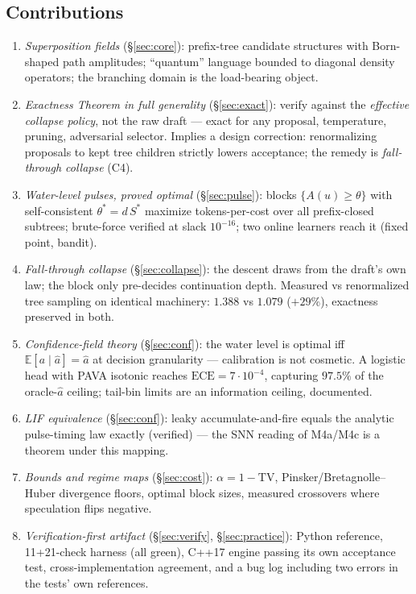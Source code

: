 \documentclass[11pt,a4paper]{article}
\theoremstyle{definition}
\begin{document}
\subsection{Contributions}
\begin{enumerate}[label=\textbf{C\arabic*},leftmargin=3.6em]
\item \emph{Superposition fields} (\S\ref{sec:core}): prefix-tree candidate
structures with Born-shaped path amplitudes; ``quantum'' language bounded to
diagonal density operators; the branching domain is the load-bearing object.
\item \emph{Exactness Theorem in full generality} (\S\ref{sec:exact}): verify
against the \emph{effective collapse policy}, not the raw draft --- exact for
any proposal, temperature, pruning, adversarial selector. Implies a design
correction: renormalizing proposals to kept tree children strictly lowers
acceptance; the remedy is \emph{fall-through collapse} (C4).
\item \emph{Water-level pulses, proved optimal} (\S\ref{sec:pulse}):
blocks $\{A(u)\ge\theta\}$ with self-consistent $\theta^\ast=d\,S^\ast$
maximize tokens-per-cost over all prefix-closed subtrees; brute-force
verified at slack $10^{-16}$; two online learners reach it (fixed point,
bandit).
\item \emph{Fall-through collapse} (\S\ref{sec:collapse}): the descent draws
from the draft's own law; the block only pre-decides continuation depth.
Measured vs renormalized tree sampling on identical machinery:
$1.388$ vs $1.079$ ($+29\%$), exactness preserved in both.
\item \emph{Confidence-field theory} (\S\ref{sec:conf}): the water level is
optimal iff $\mathbb E[a\mid\hat a]=\hat a$ at decision granularity ---
calibration is not cosmetic. A logistic head with PAVA isotonic reaches
$\mathrm{ECE}=7\cdot10^{-4}$, capturing $97.5\%$ of the oracle-$\hat a$
ceiling; tail-bin limits are an information ceiling, documented.
\item \emph{LIF equivalence} (\S\ref{sec:conf}): leaky accumulate-and-fire
equals the analytic pulse-timing law exactly (verified) --- the SNN reading
of M4a/M4c is a theorem under this mapping.
\item \emph{Bounds and regime maps} (\S\ref{sec:cost}):
$\alpha=1-\mathrm{TV}$, Pinsker/Bretagnolle--Huber divergence floors,
optimal block sizes, measured crossovers where speculation flips negative.
\item \emph{Verification-first artifact} (\S\ref{sec:verify}, \S\ref{sec:practice}):
Python reference, 11+21-check harness (all green), C++17 engine passing its
own acceptance test, cross-implementation agreement, and a bug log
including two errors in the tests' own references.
\end{enumerate}
\end{document}
